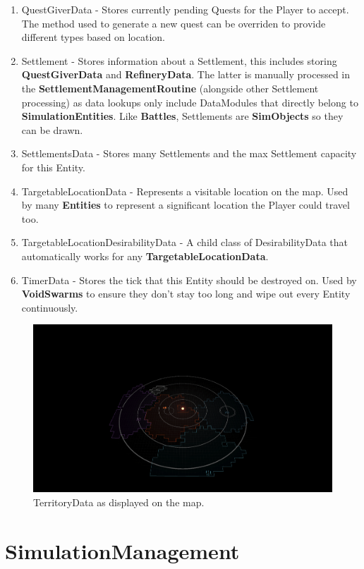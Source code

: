 \documentclass{report}
\begin{document}
\begin{enumerate}
	\item QuestGiverData - Stores currently pending Quests for the Player to accept. The method used to generate a new quest can be overriden to provide different types based on location.
	\item Settlement - Stores information about a Settlement, this includes storing \textbf{QuestGiverData} and \textbf{RefineryData}. The latter is manually processed in the \textbf{SettlementManagementRoutine} (alongside other Settlement processing) as data lookups only include DataModules that directly belong to \textbf{SimulationEntities}. Like \textbf{Battles}, Settlements are \textbf{SimObjects} so they can be drawn. 

	\item SettlementsData - Stores many Settlements and the max Settlement capacity for this Entity.
	\item TargetableLocationData - Represents a visitable location on the map. Used by many \textbf{Entities} to represent a significant location the Player could travel too.
	\item TargetableLocationDesirabilityData - A child class of DesirabilityData that automatically works for any \textbf{TargetableLocationData}.
	\item TimerData - Stores the tick that this Entity should be destroyed on. Used by \textbf{VoidSwarms} to ensure they don't stay too long and wipe out every Entity continuously.

\end{enumerate}

\begin{figure}[H]
	\centering
    \includegraphics[width=.9\textwidth]{entityExample.png}
    \caption{TerritoryData as displayed on the map.}
\end{figure}

\section{SimulationManagement}
\end{document}
